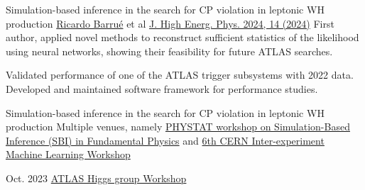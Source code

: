 



    \cventry
    {Simulation-based inference in the search for CP violation in leptonic WH production}
    {\underline{Ricardo Barrué} et al}
    {}
    {\href{https://doi.org/10.1007/JHEP04(2024)014}{J. High Energ. Phys. 2024, 14 (2024)}}
    {First author, applied novel methods to reconstruct sufficient statistics of the likelihood using neural networks, showing their feasibility for future ATLAS searches.}\vspace*{2mm}
    
    {
        Validated performance of one of the ATLAS trigger subsystems with 2022 data. Developed and maintained software framework for performance studies.
    }\vspace*{2mm}


    \cventry
    {Simulation-based inference in the search for CP violation in leptonic WH production}
    {}
    {}
    {}
    {Multiple venues, namely \href{https://indico.cern.ch/event/1355601/contributions/5910202/}{PHYSTAT workshop on Simulation-Based Inference (SBI) in Fundamental Physics} and \href{https://indico.cern.ch/event/1297159/contributions/5729232/}{6th CERN Inter-experiment Machine Learning Workshop}}\vspace*{2mm}

    {}
    {Oct. 2023}
    {\href{https://indico.cern.ch/event/1280531/contributions/5556190/}{ATLAS Higgs group Workshop}}{}\vspace*{2mm}

